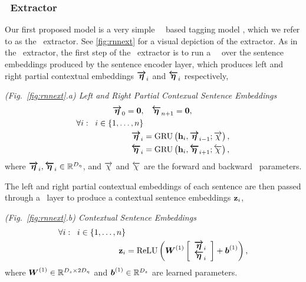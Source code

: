 \subsubsection{\rnnext~Extractor}




    Our first proposed model is a very simple 
    \bidirectional~\recurrentneuralnetwork~based tagging
    model \citep{sometagfolks}, which we refer to as the \rnnext~extractor.
See \autoref{fig:rnnext} for a visual depiction of   
the extractor.
As in the \srext~extractor, the first step of the \rnnext~extractor
is to run a \bidirectional~\recurrentneuralnetwork~over the sentence 
embeddings produced by the sentence encoder layer, which produces
left and right partial contextual embeddings $\boldsymbol{\overrightarrow{\eta}}_i$ and $\boldsymbol{\overleftarrow{\eta}}_i$
respectively,

  \vspace{10pt} \noindent\textit{(Fig.~\ref{fig:rnnext}.a) Left and Right Partial Contexual Sentence Embeddings}
\begin{align}
    \boldsymbol{\overrightarrow{\eta}}_0 = \mathbf{0}, &\quad \boldsymbol{\overleftarrow{\eta}}_{n+1} = \mathbf{0}, \\
    \forall i : \;\; i \in \{1,\ldots,n\}& \nonumber \\
 \boldsymbol{\overrightarrow{\eta}}_i &= \operatorname{GRU}\left(\mathbf{h}_i, \boldsymbol{\overrightarrow{\eta}}_{i-1}; \overrightarrow{\chi}\right), \\
 \boldsymbol{\overleftarrow{\eta}}_i &= \operatorname{GRU}\left(\mathbf{h}_i, \boldsymbol{\overleftarrow{\eta}}_{i+1};\overleftarrow{\chi}\right), 
\end{align}
where $\boldsymbol{\overrightarrow{\eta}}_i,\boldsymbol{\overleftarrow{\eta}}_i \in \mathbb{R}^{{D_\eta}}$,
and $\overrightarrow{\chi}$ and $\overleftarrow{\chi}$ are the forward and backward
\gru~parameters.

The left and right partial contextual embeddings of each sentence 
are then passed through a \feedforward~layer to produce a contextual
sentence embeddings $\mathbf{z}_i$,

\vspace{10pt}\noindent\textit{(Fig.~\ref{fig:rnnext}.b) Contextual Sentence Embeddings}
\begin{align}
    \forall i :\;\; i \in \{1,\ldots,n\}& \nonumber \\
   \mathbf{z}_i &= \operatorname{ReLU}\left(
    \boldsymbol{W}^{(1)}
    \left[ \begin{array}{c} 
        \boldsymbol{\overrightarrow{\eta}}_i \\
        \boldsymbol{\overleftarrow{\eta}}_i \end{array}\right] + \boldsymbol{b}^{(1)} \right),
\end{align}
where $\boldsymbol{W}^{(1)} \in \mathbb{R}^{{D_z} \times 2 {D_\eta}}$
and $\boldsymbol{b}^{(1)} \in \mathbb{R}^{{D_z}}$ are learned parameters.

